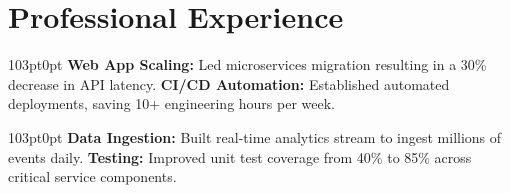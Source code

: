 \section{Professional Experience}

\begin{adjustwidth}{103pt}{0pt}
    \textbf{Web App Scaling:} Led microservices migration resulting in a 30\% decrease in API latency.\sepbullet
    \textbf{CI/CD Automation:} Established automated deployments, saving 10+ engineering hours per week.
\end{adjustwidth}

\sepentry

\begin{adjustwidth}{103pt}{0pt}
    \textbf{Data Ingestion:} Built real-time analytics stream to ingest millions of events daily.\sepbullet
    \textbf{Testing:} Improved unit test coverage from 40\% to 85\% across critical service components.
\end{adjustwidth}